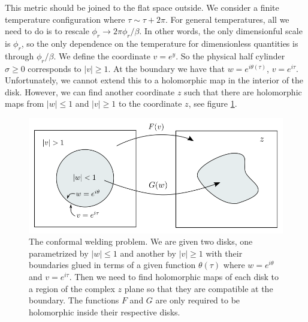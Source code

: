    
   This metric should be joined to the flat space outside.
    We consider a finite temperature 
   configuration where $\tau \sim \tau + 2 \pi$. For general temperatures,  all we need to do is to rescale $\phi_r \to  2 \pi \phi_r/\beta $. In other words,
    the only dimensionful scale is $\phi_r$, so the only dependence on the temperature for dimensionless quantities   is through $\phi_r/\beta$.   
   We   define the coordinate $v = e^y$. So the physical half cylinder $\sigma \geq 0$ corresponds to $|v|\geq 1$. 
   At the boundary we have that $w = e^{ i \theta(\tau)}$, $v = e^{ i \tau }$. 
   Unfortunately,  we cannot extend this to a holomorphic map in the interior of the disk.
    However, we can find another coordinate $z$ such that there are holomorphic maps from $|w|\leq 1$ and $|v|\geq 1$ to the coordinate $z$, see figure \ref{WandZplanes}. 
   
   \begin{figure}[t]
    \begin{center}
    \includegraphics[scale=1]{figures/welding.png}
    \end{center}
    \caption{ The conformal welding problem.  We are given two disks, one parametrized by
     $|w|\leq 1$ and another by
    $|v| \geq 1$ with their boundaries glued in terms of a given function $\theta(\tau)$ where
    $w =e^{i\theta}$ and $v=e^{i\tau}$. Then we need to find holomorphic maps of each disk to a region of the complex $z$ plane so that they are compatible at the boundary. The functions $F$ and $G$ are only required to be holomorphic inside their respective disks.   }
    \label{WandZplanes}
\end{figure}
   
